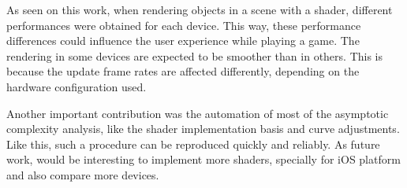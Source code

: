 \documentclass[10pt, conference, compsocconf]{IEEEtran}
\begin{document}
{As seen on this work, when rendering objects in a scene with a shader, different performances were obtained for each device. 
This way, these performance differences could influence the user experience while playing a game. 
The rendering in some devices are expected to be smoother than in others. 
This is because the update frame rates are affected differently, depending on the hardware configuration used.

Another important contribution was the automation of most of the asymptotic
complexity analysis, like the shader implementation basis and curve adjustments.
Like this, such a procedure can be reproduced quickly and reliably. As future work, would be 
interesting to implement more shaders, specially for iOS platform and also compare more devices. 








%
%



%
%


}
\end{document}
